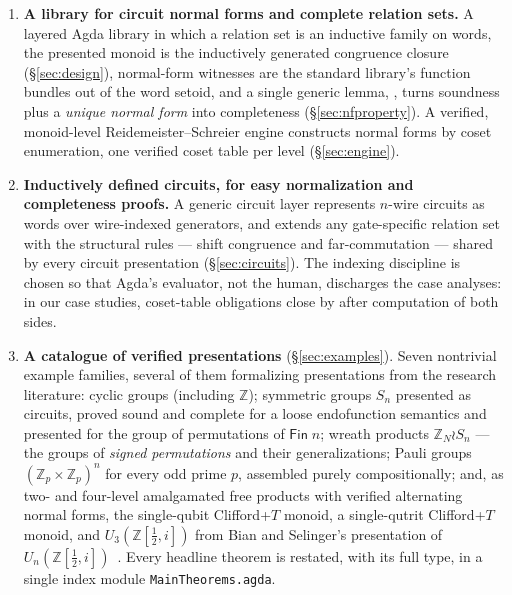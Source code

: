 \begin{enumerate}
\item[(0)] \textbf{A library for circuit normal forms and complete relation
  sets.}  A layered Agda library in which a relation set is an inductive
  family on words, the presented monoid is the inductively generated
  congruence closure (\S\ref{sec:design}), normal-form witnesses are the
  standard library's function bundles out of the word setoid, and a single
  generic lemma, , turns soundness plus a \emph{unique
  normal form} into completeness (\S\ref{sec:nfproperty}).  A verified,
  monoid-level Reidemeister--Schreier engine constructs normal forms by coset
  enumeration, one verified coset table per level
  (\S\ref{sec:engine}).

\item[(1)] \textbf{Inductively defined circuits, for easy normalization and
  completeness proofs.}  A generic circuit layer represents $n$-wire circuits
  as words over wire-indexed generators, and extends any gate-specific
  relation set with the structural rules --- shift congruence and
  far-commutation --- shared by every circuit presentation
  (\S\ref{sec:circuits}).  The indexing discipline is chosen so that Agda's
  evaluator, not the human, discharges the case analyses: in our case
  studies, coset-table obligations close by  after computation of
  both sides.

\item[(2)] \textbf{A catalogue of verified presentations}
  (\S\ref{sec:examples}).  Seven nontrivial example families, several of them
  formalizing presentations from the research literature: cyclic groups
  (including $\mathbb{Z}$); symmetric groups $S_n$ presented as circuits,
  proved sound and complete for a loose endofunction semantics and presented
  for the group of permutations of $\mathsf{Fin}\;n$; wreath products
  $\mathbb{Z}_N \wr S_n$ --- the groups of \emph{signed permutations} and
  their generalizations; Pauli groups $(\mathbb{Z}_p \times \mathbb{Z}_p)^n$
  for every odd prime $p$, assembled purely compositionally; and, as
  two- and four-level amalgamated free products with verified alternating
  normal forms, the single-qubit Clifford+$T$ monoid, a single-qutrit
  Clifford+$T$ monoid, and $U_3(\mathbb{Z}[\tfrac12,i])$ from Bian and
  Selinger's presentation of
  $U_n(\mathbb{Z}[\tfrac12,i])$~\cite{bian2021un}.  Every headline theorem is
  restated, with its full type, in a single index module
  \texttt{MainTheorems.agda}.


\end{enumerate}
